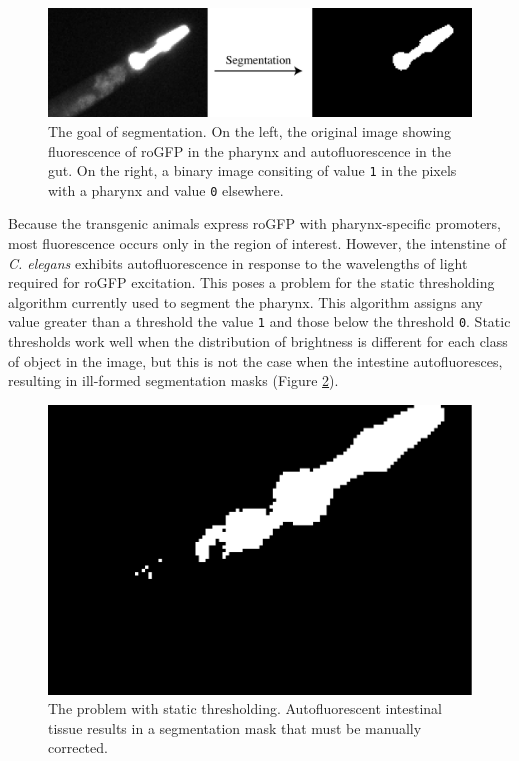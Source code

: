 \begin{figure}[ht]
    \centering
    \includegraphics[scale=.25]{Figures/rendered_files/segmentation_description}
    \decoRule
    \caption[Segmentation of a fluorescence image]{The goal of segmentation. On the left, the original image showing fluorescence of roGFP in the pharynx and autofluorescence in the gut. On the right, a binary image consiting of value \texttt{1} in the pixels with a pharynx and value \texttt{0} elsewhere.}
    \label{fig:SegmentationExample}
\end{figure}

Because the transgenic animals express roGFP with pharynx-specific promoters, most fluorescence occurs only in the region of interest. However, the intenstine of \textit{C. elegans} exhibits autofluorescence in response to the wavelengths of light required for roGFP excitation. This poses a problem for the static thresholding algorithm currently used to segment the pharynx. This algorithm assigns any value greater than a threshold the value \texttt{1} and those below the threshold \texttt{0}. Static thresholds work well when the distribution of brightness is different for each class of object in the image, but this is not the case when the intestine autofluoresces, resulting in ill-formed segmentation masks (Figure \ref{fig:SegmentationNaive}).

\begin{figure}[ht]
    \centering
    \includegraphics[scale=.25]{Figures/rendered_files/segmentation_naive}
    \decoRule
    \caption[The problem with static thresholding]{The problem with static thresholding. Autofluorescent intestinal tissue results in a segmentation mask that must be manually corrected.}
    \label{fig:SegmentationNaive}
\end{figure}

